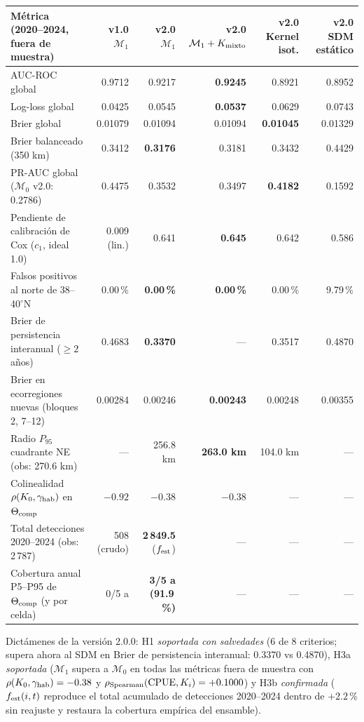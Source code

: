 \documentclass[11pt,letterpaper]{article}
\begin{document}
\begin{center}\small
\begin{tabularx}{\textwidth}{@{}Yrrrrr@{}}\toprule
Métrica (2020--2024, fuera de muestra) & v1.0 $\mathcal M_1$ & v2.0 $\mathcal M_1$ & v2.0 $\mathcal M_1+K_{\rm mixto}$ & v2.0 Kernel isot. & v2.0 SDM estático\\\midrule
AUC-ROC global & 0.9712 & 0.9217 & \textbf{0.9245} & 0.8921 & 0.8952\\
Log-loss global & 0.0425 & 0.0545 & \textbf{0.0537} & 0.0629 & 0.0743\\
Brier global & 0.01079 & 0.01094 & 0.01094 & \textbf{0.01045} & 0.01329\\
Brier balanceado (350 km) & 0.3412 & \textbf{0.3176} & 0.3181 & 0.3432 & 0.4429\\
PR-AUC global ($\mathcal M_0$ v2.0: 0.2786) & 0.4475 & 0.3532 & 0.3497 & \textbf{0.4182} & 0.1592\\
Pendiente de calibración de Cox ($c_1$, ideal 1.0) & 0.009 (lin.) & 0.641 & \textbf{0.645} & 0.642 & 0.586\\
Falsos positivos al norte de 38--40$^\circ$N & 0.00\,\% & \textbf{0.00\,\%} & \textbf{0.00\,\%} & 0.00\,\% & 9.79\,\%\\
Brier de persistencia interanual ($\ge 2$ años) & 0.4683 & \textbf{0.3370} & --- & 0.3517 & 0.4870\\
Brier en ecorregiones nuevas (bloques 2, 7--12) & 0.00284 & 0.00246 & \textbf{0.00243} & 0.00248 & 0.00355\\
Radio $P_{95}$ cuadrante NE (obs: 270.6 km) & --- & 256.8 km & \textbf{263.0 km} & 104.0 km & ---\\
Colinealidad $\rho(K_0,\gamma_{\rm hab})$ en $\Theta_{\rm comp}$ & $-0.92$ & \textbf{$-0.38$} & \textbf{$-0.38$} & --- & ---\\
Total detecciones 2020--2024 (obs: 2\,787) & 508 (crudo) & \textbf{2\,849.5} ($f_{\rm est}$) & --- & --- & ---\\
Cobertura anual P5--P95 de $\Theta_{\rm comp}$ (y por celda) & 0/5 a & \textbf{3/5 a (91.9\,\%)} & --- & --- & ---\\
\bottomrule\end{tabularx}\end{center}
Dictámenes de la versión 2.0.0: H1 \emph{soportada con salvedades} (6 de 8 criterios; supera ahora al SDM en Brier de persistencia interanual: 0.3370 vs 0.4870), H3a \emph{soportada} ($\mathcal M_1$ supera a $\mathcal M_0$ en todas las métricas fuera de muestra con $\rho(K_0,\gamma_{\rm hab})=-0.38$ y $\rho_{\rm Spearman}(\text{CPUE},K_i)=+0.1000$) y H3b \emph{confirmada} ($f_{\rm est}(i,t)$ reproduce el total acumulado de detecciones 2020--2024 dentro de $+2.2$\,\% sin reajuste y restaura la cobertura empírica del ensamble).
\end{document}
